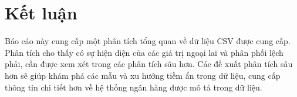 \documentclass[12pt]{article}
\begin{document}
\section{Kết luận}

Báo cáo này cung cấp một phân tích tổng quan về dữ liệu CSV được cung cấp.  Phân tích cho thấy có sự hiện diện của các giá trị ngoại lai và phân phối lệch phải, cần được xem xét trong các phân tích sâu hơn. Các đề xuất phân tích sâu hơn sẽ giúp khám phá các mẫu và xu hướng tiềm ẩn trong dữ liệu, cung cấp thông tin chi tiết hơn về hệ thống ngân hàng được mô tả trong dữ liệu.
\end{document}
